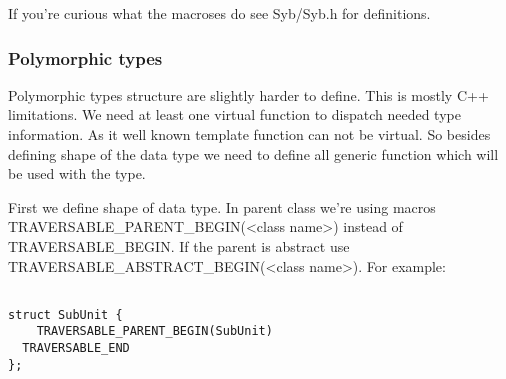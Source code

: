\documentclass[a4paper]{article}
\begin{document}
\begin{comment}
The field list can be presented no only within class definition. It's preferable way 
but for classes we can not change because they are defined in some external library
or by any other reason. You can use \lstinline{TRAVERSABLE_OUTER} macros with the same
parameters it can be defined anywhere in $namespace qx$. For example:

\begin{lstlisting}

struct Employee {
	Person& person() {return person_; }
	float& salary() {return salary_; }
private:
	Person person_;
	float salary_;
};

TRAVERSABLE_OUTER(Employee, p.person_ << p.salary_)

\end{lstlisting}

If a class has no fields you should use \lstinline{TRAVERSABLE_UNIT(<type name>)} inside the 
class definition. For example:

\begin{lstlisting}

struct SubUnit {
	TRAVERSABLE_UNIT(SubUnit)
};

\end{lstlisting}

\end{comment}
If you're curious what the macroses do see Syb/Syb.h for definitions.

\subsubsection{Polymorphic types}

Polymorphic types structure are slightly harder to define. This is mostly C++ limitations.
We need at least one virtual function to dispatch needed type information. As it well known
template function can not be virtual. So besides defining shape of the data type we need to
define all generic function which will be used with the type.

First we define shape of data type. In parent class we're using macros TRAVERSABLE\_PARENT\_BEGIN(<class name>) 
instead of TRAVERSABLE\_BEGIN. If the parent is abstract use TRAVERSABLE\_ABSTRACT\_BEGIN(<class name>).
For example:

\begin{lstlisting}

struct SubUnit {
	TRAVERSABLE_PARENT_BEGIN(SubUnit)
  TRAVERSABLE_END
};

\end{lstlisting}
\end{document}
